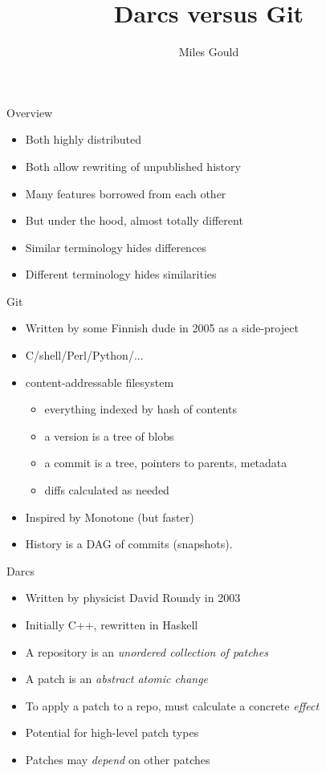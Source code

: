 \documentclass[pdf]{prosper}
\title{Darcs versus Git}
\author{Miles Gould}
\begin{document}
\maketitle


\begin{slide}{Overview}
\begin{itemize}
\item Both highly distributed
\item Both allow rewriting of unpublished history
\item Many features borrowed from each other
\item But under the hood, almost totally different
\item Similar terminology hides differences
\item Different terminology hides similarities
\end{itemize}
\end{slide}

\begin{slide}{Git}
\begin{itemize}
\item Written by some Finnish dude in 2005 as a side-project
\item C/shell/Perl/Python/...
\item content-addressable filesystem
\begin{itemize}
	\item everything indexed by hash of contents
	\item a version is a tree of blobs
	\item a commit is a tree, pointers to parents, metadata
	\item diffs calculated as needed
\end{itemize}
\item Inspired by Monotone (but faster)
\item History is a DAG of commits (snapshots).
\end{itemize}
\end{slide}

\begin{slide}{Darcs}
\begin{itemize}
\item Written by physicist David Roundy in 2003
\item Initially C++, rewritten in Haskell
\item A repository is an \emph{unordered collection of patches}
\item A patch is an \emph{abstract atomic change}
\item To apply a patch to a repo, must calculate a concrete \emph{effect}
\item Potential for high-level patch types
\item Patches may \emph{depend} on other patches
\end{itemize}
\end{slide}
\end{document}
